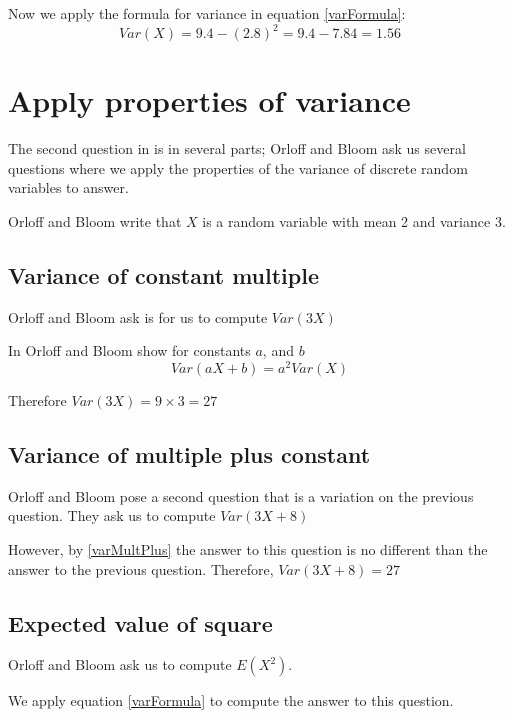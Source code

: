 \documentclass[a4paper,11pt]{article}
\begin{document}
Now we apply the formula for variance in equation \ref{varFormula}:
\begin{equation}
Var \left(X \right)
  = 9.4 - \left( 2.8 \right)^{2}
  = 9.4 - 7.84
  = 1.56
\end{equation}

\section{Apply properties of variance}

The second question in \cite{reading5aQuestions} is in several parts; Orloff
and Bloom ask us several questions where we apply the properties of the variance
of discrete random variables to answer.

Orloff and Bloom write that $X$ is a random variable with mean 2 and variance
3.

\subsection{Variance of constant multiple}
Orloff and Bloom ask is for us to compute $Var \left( 3X \right)$

In \cite{reading5a} Orloff and Bloom show for constants $a$, and $b$
\begin{equation}\label{varMultPlus}
  Var \left( aX + b\right) = a^{2}Var(X)
\end{equation}

Therefore $Var \left( 3X \right) = 9 \times 3 = 27$

\subsection{Variance of multiple plus constant}

Orloff and Bloom pose a second question that is a variation on the previous
question. They ask us to compute $Var \left( 3X + 8 \right)$

However, by \ref{varMultPlus} the answer to this question is no different than
the answer to the previous question.  Therefore, $Var \left( 3X + 8 \right) = 27$

\subsection{Expected value of square}

Orloff and Bloom ask us to compute $E \left( X^{2} \right)$.

We apply equation \ref{varFormula} to compute the answer to this question.
\end{document}
